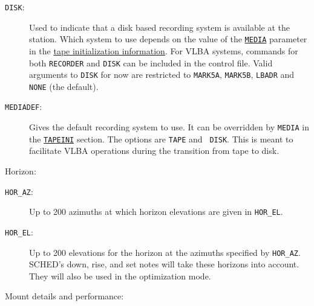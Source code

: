 \documentclass{report}
\newcommand{\sched}{{\sc SCHED}}
\begin{document}
\begin{description}
\item [{\tt DISK}:] Used to indicate that a disk based recording system
is available at the station.  Which system to use depends on the value
of the 
{\hyperref[TP:MEDIA]{{\tt MEDIA}}} parameter in the
{\hyperref[SEC:TPINI]{tape initialization information}}.  For VLBA
systems, commands for both {\tt RECORDER} and {\tt DISK} can be
included in the control file.  Valid arguments to {\tt DISK} for
now are restricted to {\tt MARK5A}, {\tt MARK5B}, {\tt LBADR}
and {\tt NONE} (the default).

\item [{\tt MEDIADEF}:] Gives the default recording system to use.  It
can be overridden by {\tt MEDIA} in the 
{\hyperref[MP:TAPEINI]{{\tt TAPEINI}}} section.
The options are {\tt TAPE} and {\tt
DISK}.  This is meant to facilitate VLBA operations during the
transition from tape to disk.

\end{description}

Horizon:

\begin{description}

\item [{\tt HOR\_AZ}:] Up to 200 azimuths at which horizon elevations
are given in {\tt HOR\_EL}.

\item [{\tt HOR\_EL}:] Up to 200 elevations for the horizon at the
azimuths specified by {\tt HOR\_AZ}. \sched's down, rise, and set
notes will take these horizons into account. They will also be used in
the optimization mode.

\end{description}

Mount details and performance:
\end{document}
